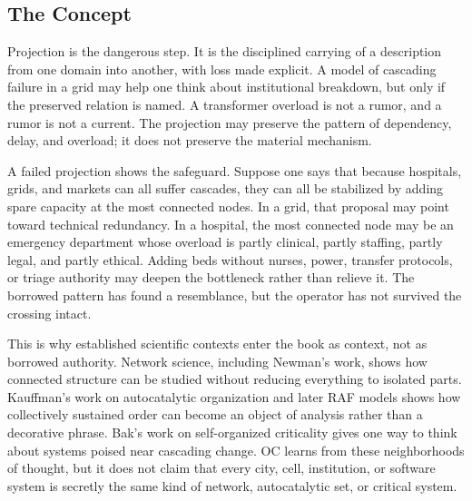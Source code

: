 \documentclass[11pt,a4paper,openany]{book}
\begin{document}
\subsection{The Concept}
Projection is the dangerous step. It is the disciplined carrying of a description from one domain into another, with loss made explicit. A model of cascading failure in a grid may help one think about institutional breakdown, but only if the preserved relation is named. A transformer overload is not a rumor, and a rumor is not a current. The projection may preserve the pattern of dependency, delay, and overload; it does not preserve the material mechanism. \cite{kauffman_autocatalytic,raf_networks}\par
A failed projection shows the safeguard. Suppose one says that because hospitals, grids, and markets can all suffer cascades, they can all be stabilized by adding spare capacity at the most connected nodes. In a grid, that proposal may point toward technical redundancy. In a hospital, the most connected node may be an emergency department whose overload is partly clinical, partly staffing, partly legal, and partly ethical. Adding beds without nurses, power, transfer protocols, or triage authority may deepen the bottleneck rather than relieve it. The borrowed pattern has found a resemblance, but the operator has not survived the crossing intact.\par
This is why established scientific contexts enter the book as context, not as borrowed authority. Network science, including Newman's work, shows how connected structure can be studied without reducing everything to isolated parts. Kauffman's work on autocatalytic organization and later RAF models shows how collectively sustained order can become an object of analysis rather than a decorative phrase. Bak's work on self-organized criticality gives one way to think about systems poised near cascading change. OC learns from these neighborhoods of thought, but it does not claim that every city, cell, institution, or software system is secretly the same kind of network, autocatalytic set, or critical system.\par
\end{document}
